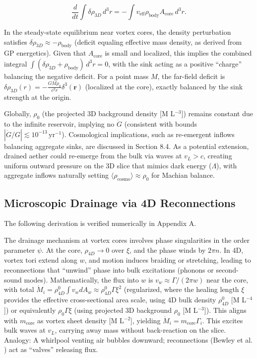 \documentclass{article}
\begin{document}
\[
\frac{d}{dt} \int \delta\rho_{3D} \, d^3 r = - \int v_{\text{eff}} \rho_{\text{body}} A_{\text{core}} \, d^3 r.
\]

In the steady-state equilibrium near vortex cores, the density perturbation satisfies $\delta\rho_{3D} \approx - \rho_{\text{body}}$ (deficit equaling effective mass density, as derived from GP energetics). Given that $A_{\text{core}}$ is small and localized, this implies the combined integral $\int (\delta\rho_{3D} + \rho_{\text{body}}) \, d^3 r = 0$, with the sink acting as a positive ``charge'' balancing the negative deficit. For a point mass $M$, the far-field deficit is $\delta\rho_{3D}(r) = - \frac{G M \rho_0}{c^2 r} \delta^3(\mathbf{r})$ (localized at the core), exactly balanced by the sink strength at the origin.

Globally, $\rho_0$ (the projected 3D background density [M L$^{-3}$]) remains constant due to the infinite reservoir, implying no $\dot{G}$ (consistent with bounds $|\dot{G}/G| \lesssim 10^{-13} \, \mathrm{yr}^{-1}$). Cosmological implications, such as re-emergent inflows balancing aggregate sinks, are discussed in Section 8.4. As a potential extension, drained aether could re-emerge from the bulk via waves at $v_L > c$, creating uniform outward pressure on the 3D slice that mimics dark energy ($\Lambda$), with aggregate inflows naturally setting $\langle \rho_{\text{cosmo}} \rangle \approx \rho_0$ for Machian balance.

\subsection{Microscopic Drainage via 4D Reconnections}

The following derivation is verified numerically in Appendix A.

The drainage mechanism at vortex cores involves phase singularities in the order parameter $\psi$. At the core, $\rho_{4D} \to 0$ over $\xi$, and the phase winds by $2\pi n$. In 4D, vortex tori extend along $w$, and motion induces braiding or stretching, leading to reconnections that ``unwind'' phase into bulk excitations (phonons or second-sound modes). Mathematically, the flux into $w$ is $v_w \approx \Gamma / (2\pi w)$ near the core, with total $\dot{M}_i = \rho_{4D}^0 \int v_w dA_w \approx \rho_{4D}^0 \Gamma \xi^2$ (regularized, where the healing length $\xi$ provides the effective cross-sectional area scale, using 4D bulk density $\rho_{4D}^0$ [M L$^{-4}$]) or equivalently $\rho_0 \Gamma \xi$ (using projected 3D background $\rho_0$ [M L$^{-3}$]). This aligns with $m_{\text{core}}$ as vortex sheet density [M L$^{-2}$], yielding $\dot{M}_i = m_{\text{core}} \Gamma_i$. This excites bulk waves at $v_L$, carrying away mass without back-reaction on the slice. Analogy: A whirlpool venting air bubbles downward; reconnections (Bewley et al. \cite{bewley2008characterization}) act as ``valves'' releasing flux.
\end{document}
